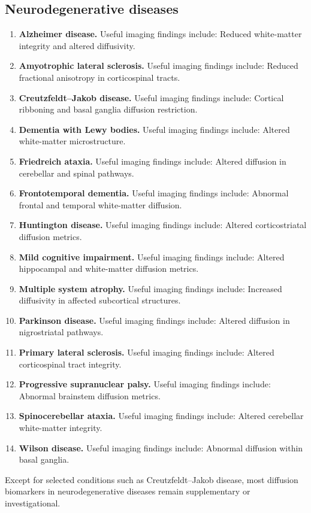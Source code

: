 \subsection{Neurodegenerative diseases}
\begin{enumerate}[leftmargin=*,itemsep=0.45em,topsep=0.4em]
\item \textbf{Alzheimer disease.} Useful imaging findings include: Reduced white-matter integrity and altered diffusivity.
\item \textbf{Amyotrophic lateral sclerosis.} Useful imaging findings include: Reduced fractional anisotropy in corticospinal tracts.
\item \textbf{Creutzfeldt--Jakob disease.} Useful imaging findings include: Cortical ribboning and basal ganglia diffusion restriction.
\item \textbf{Dementia with Lewy bodies.} Useful imaging findings include: Altered white-matter microstructure.
\item \textbf{Friedreich ataxia.} Useful imaging findings include: Altered diffusion in cerebellar and spinal pathways.
\item \textbf{Frontotemporal dementia.} Useful imaging findings include: Abnormal frontal and temporal white-matter diffusion.
\item \textbf{Huntington disease.} Useful imaging findings include: Altered corticostriatal diffusion metrics.
\item \textbf{Mild cognitive impairment.} Useful imaging findings include: Altered hippocampal and white-matter diffusion metrics.
\item \textbf{Multiple system atrophy.} Useful imaging findings include: Increased diffusivity in affected subcortical structures.
\item \textbf{Parkinson disease.} Useful imaging findings include: Altered diffusion in nigrostriatal pathways.
\item \textbf{Primary lateral sclerosis.} Useful imaging findings include: Altered corticospinal tract integrity.
\item \textbf{Progressive supranuclear palsy.} Useful imaging findings include: Abnormal brainstem diffusion metrics.
\item \textbf{Spinocerebellar ataxia.} Useful imaging findings include: Altered cerebellar white-matter integrity.
\item \textbf{Wilson disease.} Useful imaging findings include: Abnormal diffusion within basal ganglia.
\end{enumerate}
Except for selected conditions such as Creutzfeldt--Jakob disease, most diffusion biomarkers in neurodegenerative diseases remain supplementary or investigational.

